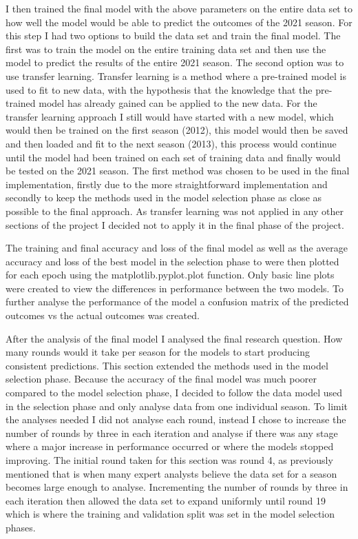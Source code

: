 \documentclass{imc-inf}
\begin{document}
	I then trained the final model with the above parameters on the entire data set to how well the model would be able to predict the outcomes of the 2021 season. For this step I had two options to build the data set and train the final model. The first was to train the model on the entire training data set and then use the model to predict the results of the entire 2021 season. The second option was to use transfer learning. Transfer learning is a method where a pre-trained model is used to fit to new data, with the hypothesis that the knowledge that the pre-trained model has already gained can be applied to the new data. For the transfer learning approach I still would have started with a new model, which would then be trained on the first season (2012), this model would then be saved and then loaded and fit to the next season (2013), this process would continue until the model had been trained on each set of training data and finally would be tested on the 2021 season.
	The first method was chosen to be used in the final implementation, firstly due to the more straightforward implementation and secondly to keep the methods used in the model selection phase as close as possible to the final approach. As transfer learning was not applied in any other sections of the project I decided not to apply it in the final phase of the project.
	
	The training and final accuracy and loss of the final model as well as the average accuracy and loss of the best model in the selection phase to were then plotted for each epoch using the matplotlib.pyplot.plot function. Only basic line plots were created to view the differences in performance between the two models. To further analyse the performance of the model a confusion matrix of the predicted outcomes vs the actual outcomes was created. 
		
	After the analysis of the final model I analysed the final research question. How many rounds would it take per season for the models to start producing consistent predictions. This section extended the methods used in the model selection phase. Because the accuracy of the final model was much poorer compared to the model selection phase, I decided to follow the data model used in the selection phase and only analyse data from one individual season. To limit the analyses needed I did not analyse each round, instead I chose to increase the number of rounds by three in each iteration and analyse if there was any stage where a major increase in performance occurred or where the models stopped improving. The initial round taken for this section was round 4, as previously mentioned that is when many expert analysts believe the data set for a season becomes large enough to analyse. Incrementing the number of rounds by three in each iteration then allowed the data set to expand uniformly until round 19 which is where the training and validation split was set in the model selection phases.
		
\end{document}
